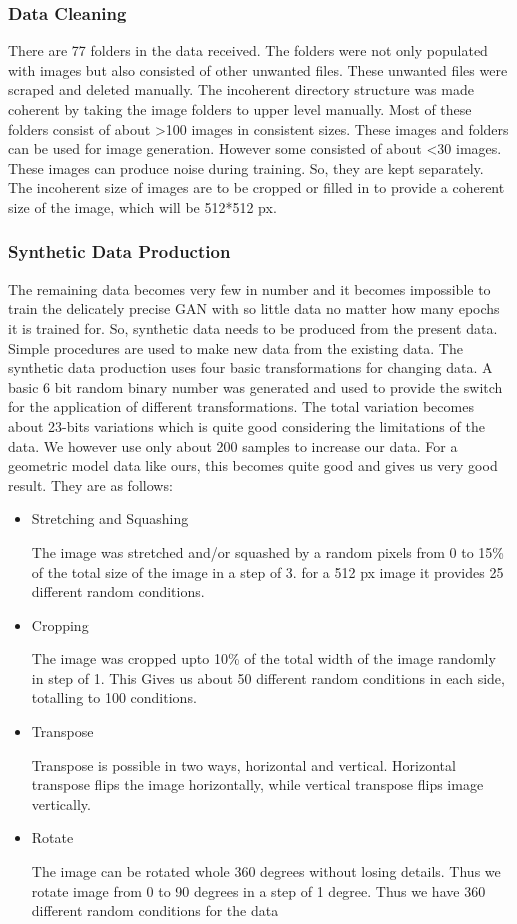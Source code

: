 \documentclass{article}
\begin{document}
    \subsubsection{Data Cleaning}
    There are 77 folders in the data received. The folders were not only populated with images but also consisted of other unwanted files. These unwanted files were scraped and deleted manually. The incoherent directory structure was made coherent by taking the image folders to upper level manually. Most of these folders consist of about >100 images in consistent sizes. These images and folders can be used for image generation. However some consisted of about <30 images. These images can produce noise during training. So, they are kept separately. The incoherent size of images are to be cropped or filled in to provide a coherent size of the image, which will be 512*512 px.
    
    \subsubsection{Synthetic Data Production}
    The remaining data becomes very few in number and it becomes impossible to train the delicately precise GAN with so little data no matter how many epochs it is trained for. So, synthetic data needs to be produced from the present data. Simple procedures are used to make new data from the existing data. The synthetic data production uses four basic transformations for changing data. A basic 6 bit random binary number was generated and used to provide the switch for the application of different transformations. The total variation becomes about 23-bits variations which is quite good considering the limitations of the data. We however use only about 200 samples to increase our data. For a geometric model data like ours, this becomes quite good and gives us very good result.
    They are as follows:
    \begin{itemize}
	\item Stretching and Squashing
	
	The image was stretched and/or squashed by a random pixels from 0 to 15\% of the total size of the image in a step of 3. for a 512 px image it provides 25 different random conditions.
	\item Cropping
	
	The image was cropped upto 10\% of the total width of the image randomly in step of 1. This Gives us about 50 different random conditions in each side, totalling to 100 conditions.
	\item Transpose
	
	Transpose is possible in two ways, horizontal and vertical. Horizontal transpose flips the image horizontally, while vertical transpose flips image vertically.
	\item Rotate
	
	The image can be rotated whole 360 degrees without losing details. Thus we rotate image from 0 to 90 degrees in a step of 1 degree. Thus we have 360 different random conditions for the data
    \end{itemize}
    
\end{document}
